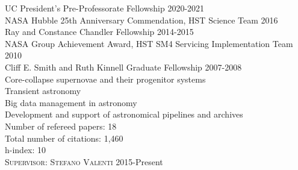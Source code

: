 \documentclass[10pt]{cv}
\begin{document}
\begin{llist}
\vspace{-0.1in}   
UC President's Pre-Professorate Fellowship \hfill 2020-2021\\
NASA Hubble 25th Anniversary Commendation, HST Science Team \hfill 2016 \\ %
Ray and Constance Chandler Fellowship \hfill 2014-2015 \\ %
NASA Group Achievement Award, HST SM4 Servicing Implementation Team \hfill2010 \\
Cliff E. Smith and Ruth Kinnell Graduate Fellowship \hfill 2007-2008\\ %
\vspace{-0.1in}   
Core-collapse supernovae and their progenitor systems\\
Transient astronomy\\
Big data management in astronomy\\
Development and support of astronomical pipelines and archives\\ 
\vspace{-0.1in}   
\vspace{-0.1in}   
Number of refereed papers: 18\\
Total number of citations: 1,460\\
h-index: 10\\
\vspace{-0.1in}   
\newpage
{} 
\textsc{Supervisor: Stefano Valenti} \hfill 2015-Present\\
\begin{minipage}[l]{0.7\textwidth}\vspace{0.15cm}

\end{minipage}
\end{llist}
\end{document}

